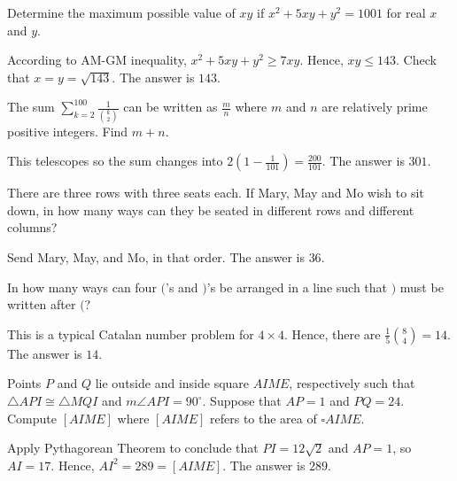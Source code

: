 \begin{problem}
Determine the maximum possible value of $xy$ if $x^2+5xy+y^2=1001$ for real $x$ and $y$.
\end{problem}

\begin{solution}
According to AM-GM inequality, $x^2+5xy+y^2\geq 7xy$. Hence, $xy\leq 143$. Check that $x=y=\sqrt{143}$. The answer is $143$.
\end{solution}

\begin{problem}
The sum $\sum_{k=2}^{100}\frac{1}{\binom{k}{2}}$ can be written as $\frac{m}{n}$ where $m$ and $n$ are relatively prime positive integers. Find $m+n$.
\end{problem}

\begin{solution}
This telescopes so the sum changes into $2(1-\frac{1}{101})=\frac{200}{101}$. The answer is $301$.
\end{solution}

\begin{problem}
There are three rows with three seats each. If Mary, May and Mo wish to sit down, in how many ways can they be seated in different rows and different columns?
\end{problem}

\begin{solution}
Send Mary, May, and Mo, in that order. The answer is $36$.
\end{solution}

\begin{problem}
In how many ways can four $($'s and $)$'s be arranged in a line such that $)$ must be written after $($?
\end{problem}

\begin{solution}
This is a typical Catalan number problem for $4\times4$. Hence, there are $\frac{1}{5}\binom{8}{4}=14$. The answer is $14$.
\end{solution}

\begin{problem}
Points $P$ and $Q$ lie outside and inside square $AIME$, respectively such that $\triangle API \cong \triangle MQI$ and $m\angle API = 90^\circ$. Suppose that $AP=1$ and $PQ=24$. Compute $[AIME]$ where $[AIME]$ refers to the area of $\square AIME$.
\end{problem}

\begin{solution}
Apply Pythagorean Theorem to conclude that $PI=12\sqrt{2}$ and $AP=1$, so $AI=17$. Hence, $AI^2=289=[AIME]$. The answer is $289$.
\end{solution}

